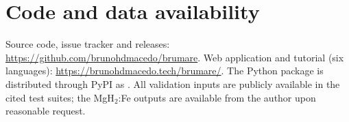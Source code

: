 \section*{Code and data availability}
Source code, issue tracker and releases: \url{https://github.com/brunohdmacedo/brumare}. Web application and tutorial (six languages): \url{https://brunohdmacedo.tech/brumare/}. The Python package is distributed through PyPI as . All validation inputs are publicly available in the cited test suites; the MgH$_2$:Fe outputs are available from the author upon reasonable request.
